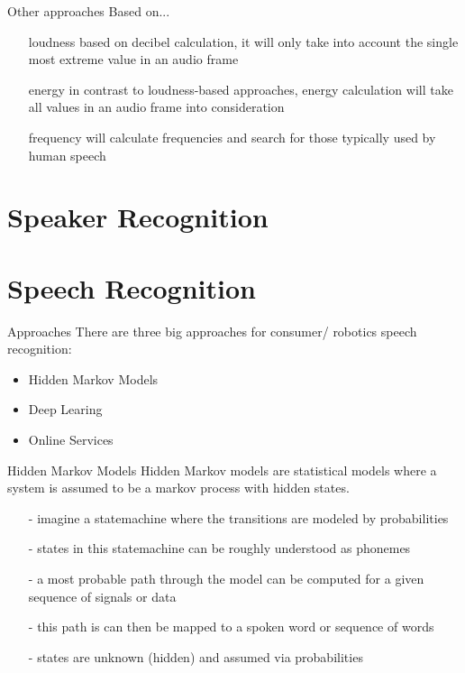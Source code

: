 \documentclass{beamer}
\begin{document}
	\begin{frame}{Other approaches}
		Based on...
		\begin{itemize}
			\item[loudness] based on decibel calculation, it will only take into account the single most extreme value in an audio frame
			\item[energy] in contrast to loudness-based approaches, energy calculation will take all values in an audio frame into consideration
			\item[frequency] will calculate frequencies and search for those typically used by human speech
		\end{itemize}
	\end{frame}
	
	\section{Speaker Recognition}%
	
	\section{Speech Recognition}%
	
	\begin{frame}{Approaches}
		There are three big approaches for consumer/ robotics speech recognition:
		\begin{itemize}
			\item Hidden Markov Models
			\item Deep Learing
			\item Online Services
		\end{itemize}
	\end{frame}
	
	\begin{frame}{Hidden Markov Models}
		Hidden Markov models are statistical models where a system is assumed to be a markov process with hidden states.
		\begin{itemize}
			\item[-] imagine a statemachine where the transitions are modeled by probabilities
			\item[-] states in this statemachine can be roughly understood as phonemes
			\item[-] a most probable path through the model can be computed for a given sequence of signals or data 
			\item[-] this path is can then be mapped to a spoken word or sequence of words
			\item[-] states are unknown (hidden) and assumed via probabilities
		\end{itemize}
	\end{frame}
	
\end{document}

